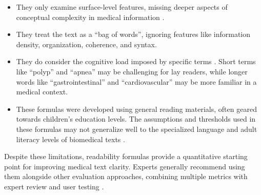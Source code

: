 \begin{itemize}
    \item They only examine surface-level features, missing deeper aspects of conceptual complexity in medical information \cite{Crossley2022, WANG2013503, Singh2024}.
    
    \item They treat the text as a ``bag of words'', ignoring features like information density, organization, coherence, and syntax.
    
    \item They do consider the cognitive load imposed by specific terms \cite{Swanson2024}. Short terms like ``polyp'' and ``apnea'' may be challenging for lay readers, while longer words like ``gastrointestinal'' and ``cardiovascular'' may be more familiar in a medical context.
    
    \item These formulas were developed using general reading materials, often geared towards children's education levels. The assumptions and thresholds used in these formulas may not generalize well to the specialized language and adult literacy levels of biomedical texts \cite{Crossley2022}.

\end{itemize}

Despite these limitations, readability formulas provide a quantitative starting point for improving medical text clarity. Experts generally recommend using them alongside other evaluation approaches, combining multiple metrics with expert review and user testing \cite{Ko2024-dd, tanprasert-kauchak-2021-flesch}.